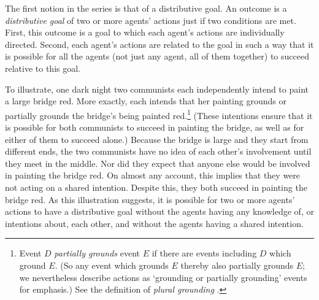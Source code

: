 \documentclass[12pt,a4paper]{extarticle}
\begin{document}
The first notion in the series is that of a distributive goal.
An outcome is a \emph{distributive goal} of two or more agents' actions just if two conditions are met.
First, this outcome is a goal to which each agent's actions are individually directed.
Second, each agent's actions are related to the goal in such a way that it is possible for all the agents (not just any agent, all of them together) to succeed relative to this goal.

To illustrate, one dark night two communists each independently intend to paint a large bridge red.   
More exactly, each intends that her painting grounds or partially grounds the bridge's being painted red.\footnote{
Event $D$ \emph{partially grounds} event $E$ if there are events including $D$ which ground $E$.
(So any event which grounds $E$ thereby also partially grounds $E$; 
we nevertheless describe actions as `grounding or partially grounding' events for emphasis.)
See the definition of \emph{plural grounding} .
}  
(These intentions ensure that it is possible for both communists to succeed in painting the bridge, as well as for either of them to succeed alone.)
Because the bridge is large and they start from different ends, the two communists have no idea of each other's involvement until they meet in the middle.
Nor did they expect that anyone else would be involved in painting the bridge red.  
On almost any account, this implies that they were not acting on a shared intention.
Despite this, 
they both succeed in painting the bridge red. 
As this illustration suggests, 
it is possible for two or more agents' actions to have a distributive goal without the agents having any knowledge of, or intentions about, each other, and without the agents having a shared intention.

\end{document}
